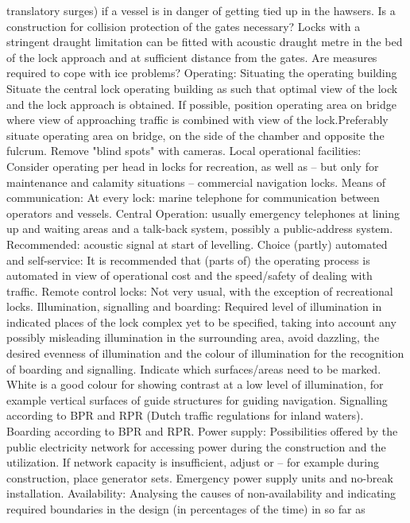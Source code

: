 translatory surges) if a vessel is in danger of getting tied up in
the hawsers.
Is a construction for collision protection of the gates necessary?
Locks with a stringent draught limitation can be fitted with acoustic
draught metre in the bed of the lock approach and at sufficient distance
from the gates.
Are measures required to cope with ice problems?
Operating:
Situating the operating building
Situate the central lock operating building as such that optimal view
of the lock and the lock approach is obtained. If possible, position
operating area on bridge where view of approaching traffic is combined
with view of the lock.Preferably situate operating area on
bridge, on the side of the chamber and opposite the fulcrum.
Remove "blind spots" with cameras.
Local operational facilities:
Consider operating per head in locks for recreation, as well as – but
only for maintenance and calamity situations – commercial navigation
locks.
Means of communication:
At every lock: marine telephone for communication between operators
and vessels.
Central Operation: usually emergency telephones at lining up and
waiting areas and a talk-back system, possibly a public-address
system.
Recommended: acoustic signal at start of levelling.
Choice (partly) automated and self-service:
It is recommended that (parts of) the operating process is automated
in view of operational cost and the speed/safety of dealing with
traffic.
Remote control locks:
Not very usual, with the exception of recreational locks.
Illumination, signalling and boarding:
Required level of illumination in indicated places of the lock complex
yet to be specified, taking into account any possibly
misleading illumination in the surrounding area, avoid dazzling,
the desired evenness of illumination and the colour of illumination
for the recognition of boarding and signalling.
Indicate which surfaces/areas need to be marked. White is a good
colour for showing contrast at a low level of illumination, for
example vertical surfaces of guide structures for guiding navigation.
Signalling according to BPR and RPR (Dutch traffic regulations for
inland waters).
Boarding according to BPR and RPR.
Power supply:
Possibilities offered by the public electricity network for accessing
power during the construction and the utilization. If network capacity
is insufficient, adjust or – for example during construction,
place generator sets.
Emergency power supply units and no-break installation.
Availability:
Analysing the causes of non-availability and indicating required
boundaries in the design (in percentages of the time) in so far as
